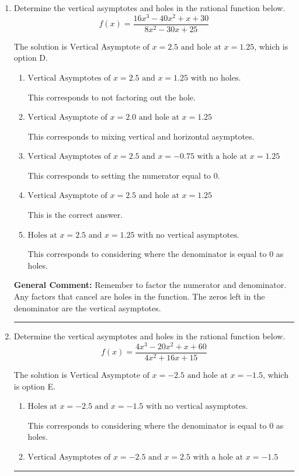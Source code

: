 \documentclass{extbook}[14pt]
\newcommand{\litem}[1]{\item #1

\rule{\textwidth}{0.4pt}}
\begin{document}
\begin{enumerate}\litem{
Determine the vertical asymptotes and holes in the rational function below.
\[ f(x) = \frac{16x^{3} -40 x^{2} +x + 30}{8x^{2} -30 x + 25} \]

The solution is \( \text{Vertical Asymptote of } x = 2.5 \text{ and hole at } x = 1.25 \), which is option D.\begin{enumerate}[label=\Alph*.]
\item \( \text{Vertical Asymptotes of } x = 2.5 \text{ and } x = 1.25 \text{ with no holes.} \)

This corresponds to not factoring out the hole.
\item \( \text{Vertical Asymptote of } x = 2.0 \text{ and hole at } x = 1.25 \)

This corresponds to mixing vertical and horizontal asymptotes.
\item \( \text{Vertical Asymptotes of } x = 2.5 \text{ and } x = -0.75 \text{ with a hole at } x = 1.25 \)

This corresponds to setting the numerator equal to 0.
\item \( \text{Vertical Asymptote of } x = 2.5 \text{ and hole at } x = 1.25 \)

This is the correct answer.
\item \( \text{Holes at } x = 2.5 \text{ and } x = 1.25 \text{ with no vertical asymptotes.} \)

This corresponds to considering where the denominator is equal to 0 as holes.
\end{enumerate}

\textbf{General Comment:} Remember to factor the numerator and denominator. Any factors that cancel are holes in the function. The zeros left in the denominator are the vertical asymptotes.
}
\litem{
Determine the vertical asymptotes and holes in the rational function below.
\[ f(x) = \frac{4x^{3} -20 x^{2} +x + 60}{4x^{2} +16 x + 15} \]

The solution is \( \text{Vertical Asymptote of } x = -2.5 \text{ and hole at } x = -1.5 \), which is option E.\begin{enumerate}[label=\Alph*.]
\item \( \text{Holes at } x = -2.5 \text{ and } x = -1.5 \text{ with no vertical asymptotes.} \)

This corresponds to considering where the denominator is equal to 0 as holes.
\item \( \text{Vertical Asymptotes of } x = -2.5 \text{ and } x = 2.5 \text{ with a hole at } x = -1.5 \)


\end{enumerate}}
\end{enumerate}
\end{document}
